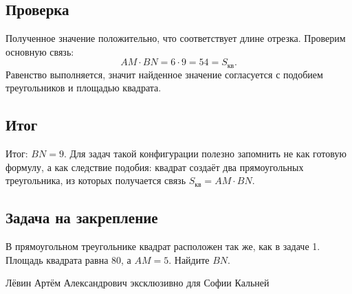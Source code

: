 \documentclass[12pt,a4paper]{article}
\begin{document}
\subsection*{Проверка}
Полученное значение положительно, что соответствует длине отрезка. Проверим основную связь:
\[
AM\cdot BN=6\cdot 9=54=S_{\text{кв}}.
\]
Равенство выполняется, значит найденное значение согласуется с подобием треугольников и площадью квадрата.

\subsection*{Итог}
\textcolor{teal!60!black}{Итог:} $BN=9$. Для задач такой конфигурации полезно запомнить не как готовую формулу, а как следствие подобия: квадрат создаёт два прямоугольных треугольника, из которых получается связь $S_{\text{кв}}=AM\cdot BN$.

\subsection*{Задача на закрепление}
В прямоугольном треугольнике квадрат расположен так же, как в задаче 1. Площадь квадрата равна $80$, а $AM=5$. Найдите $BN$.

\vfill
\begin{center}
\small Лёвин Артём Александрович эксклюзивно для Софии Кальней
\end{center}
\end{document}

